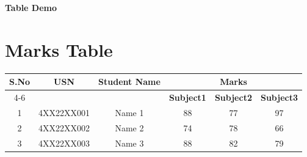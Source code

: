 \documentclass[10pt,a4paper]{article}
\begin{document}
\begin{center}
\Large
\textbf{Table Demo}
\Large
\end{center}
\section*{Marks Table}
\begin{tabular}{|c|c|c|c|c|c|}
\hline
\multirow{2}{*}{\textbf{S.No}} &    \multirow{2}{*}{\textbf{USN}} &   
\multirow{2}{*}{\textbf{Student Name}} &    \multicolumn{3}{c|}{\textbf{Marks}
}\\
\cline{4-6}
&    &    &   \textbf{ Subject1} &    \textbf{Subject2} &    \textbf{Subject3} \\
\hline
1 &    4XX22XX001 &   Name 1 &   88 &    77 &    97 \\
\hline
2 &    4XX22XX002 &   Name 2 &   74 &    78 &    66 \\
\hline
3 &    4XX22XX003 &   Name 3 &   88 &    82 &    79 \\
\hline
\end{tabular}
\end{document}
